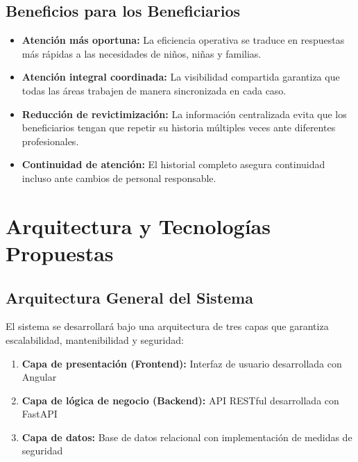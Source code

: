 \documentclass[12pt,letterpaper]{article}
\begin{document}
\subsection{Beneficios para los Beneficiarios}

\begin{itemize}
    \item \textbf{Atención más oportuna:} La eficiencia operativa se traduce en respuestas más rápidas a las necesidades de niños, niñas y familias.
    
    \item \textbf{Atención integral coordinada:} La visibilidad compartida garantiza que todas las áreas trabajen de manera sincronizada en cada caso.
    
    \item \textbf{Reducción de revictimización:} La información centralizada evita que los beneficiarios tengan que repetir su historia múltiples veces ante diferentes profesionales.
    
    \item \textbf{Continuidad de atención:} El historial completo asegura continuidad incluso ante cambios de personal responsable.
\end{itemize}

\newpage

\section{Arquitectura y Tecnologías Propuestas}

\subsection{Arquitectura General del Sistema}

El sistema se desarrollará bajo una arquitectura de tres capas que garantiza escalabilidad, mantenibilidad y seguridad:

\begin{enumerate}
    \item \textbf{Capa de presentación (Frontend):} Interfaz de usuario desarrollada con Angular
    \item \textbf{Capa de lógica de negocio (Backend):} API RESTful desarrollada con FastAPI
    \item \textbf{Capa de datos:} Base de datos relacional con implementación de medidas de seguridad
\end{enumerate}
\end{document}

